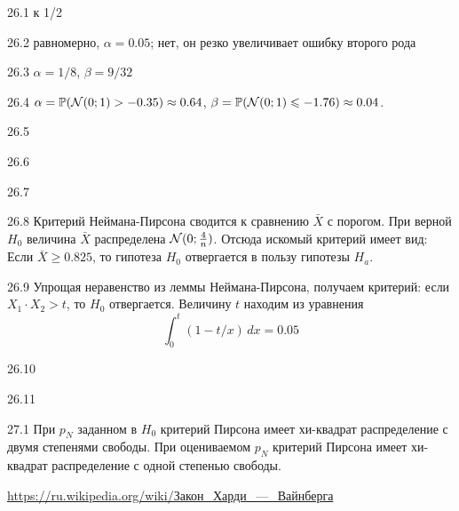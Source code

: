 \begin{solution}{{26.1}}
к 1/2
\end{solution}
\protect \hypertarget {soln:26.2}{}
\begin{solution}{{26.2}}
  равномерно, $\alpha=0.05$; нет, он резко увеличивает ошибку второго рода
\end{solution}
\protect \hypertarget {soln:26.3}{}
\begin{solution}{{26.3}}
  $\alpha = 1/8$, $\beta = 9/32$
\end{solution}
\protect \hypertarget {soln:26.4}{}
\begin{solution}{{26.4}}
  $\alpha = \mathbb{P}(\mathcal{N}(0;1) > -0.35) \approx 0.64$, $\beta = \mathbb{P}(\mathcal{N}(0;1) \leqslant -1.76) \approx 0.04$.
\end{solution}
\protect \hypertarget {soln:26.5}{}
\begin{solution}{{26.5}}
\end{solution}
\protect \hypertarget {soln:26.6}{}
\begin{solution}{{26.6}}
\end{solution}
\protect \hypertarget {soln:26.7}{}
\begin{solution}{{26.7}}

\end{solution}
\protect \hypertarget {soln:26.8}{}
\begin{solution}{{26.8}}
Критерий Неймана-Пирсона сводится к сравнению $\bar X$ с порогом. При верной $H_0$ величина $\bar X$ распределена $\mathcal{N}(0; \frac{4}{n})$.
Отсюда искомый критерий имеет вид:
Если $\bar X  \geqslant 0.825$, то гипотеза ${H_0}$ отвергается в пользу гипотезы ${H_a}$.
\end{solution}
\protect \hypertarget {soln:26.9}{}
\begin{solution}{{26.9}}
  Упрощая неравенство из леммы Неймана-Пирсона, получаем критерий: если $X_1\cdot X_2 >t$, то $H_0$ отвергается. Величину $t$ находим из уравнения
\[
\int_0^t (1 - t/x) \, dx = 0.05
\]
\end{solution}
\protect \hypertarget {soln:26.10}{}
\begin{solution}{{26.10}}

\end{solution}
\protect \hypertarget {soln:26.11}{}
\begin{solution}{{26.11}}
\end{solution}
\protect \hypertarget {soln:27.1}{}
\begin{solution}{{27.1}}
При $p_N$ заданном в $H_0$ критерий Пирсона имеет хи-квадрат распределение с двумя степенями свободы.
При оцениваемом $p_N$ критерий Пирсона имеет хи-квадрат распределение с одной степенью свободы.

\url{https://ru.wikipedia.org/wiki/Закон_Харди_—_Вайнберга}
  
\end{solution}
